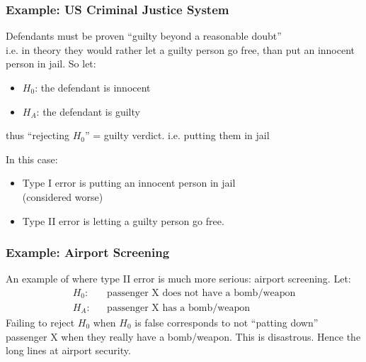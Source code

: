 \documentclass[handout]{beamer}
\newcommand{\blue}[1]{\textcolor{blue2}{#1}}
\begin{document}
\begin{frame}
\frametitle{Example:  US Criminal Justice System}
Defendants must be proven ``guilty beyond a reasonable doubt''\\
\pause i.e. in theory they would rather let a guilty person go free, than put an innocent person in jail.  \pause So let:

\vskip 0.25cm

\begin{itemize}
\item $H_0$: the defendant is innocent
\item $H_A$: the defendant is guilty
\end{itemize}
\pause thus ``rejecting $H_0$'' = guilty verdict.  i.e. putting them in jail

\vskip 0.25cm

\pause In this case:
\begin{itemize}
\item Type I error is putting an innocent person in jail\\
(considered worse)
\item Type II error is letting a guilty person go free.  
\end{itemize}
\end{frame}


\begin{frame}
\frametitle{Example:  Airport Screening}
An example of where type II error is much more serious:  \blue{airport screening}. \pause Let:
\begin{eqnarray*}
H_0: && \mbox{passenger X does not have a bomb/weapon}\\
H_A: && \mbox{passenger X has a bomb/weapon}
\end{eqnarray*}
\pause Failing to reject $H_0$ when $H_0$ is false corresponds to not ``patting down'' passenger X when they really have a bomb/weapon.  This is disastrous.
\vskip 0.25cm
\pause Hence the long lines at airport security.  
\end{frame}
\end{document}
